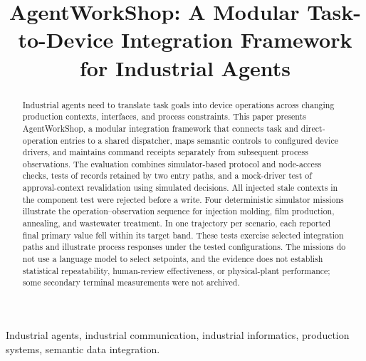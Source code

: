 \documentclass[journal]{IEEEtran}
\begin{document}

\title{AgentWorkShop: A Modular Task-to-Device Integration Framework for Industrial Agents}

\author{}

\maketitle

\begin{abstract}
Industrial agents need to translate task goals into device operations across
changing production contexts, interfaces, and process constraints. This paper
presents AgentWorkShop, a modular integration framework that connects task and
direct-operation entries to a shared dispatcher, maps semantic controls to
configured device drivers, and maintains command receipts separately from
subsequent process observations. The evaluation combines simulator-based
protocol and node-access checks, tests of records retained by two entry paths,
and a mock-driver test of approval-context revalidation using simulated
decisions. All injected stale contexts in the component test were rejected
before a write. Four deterministic
simulator missions illustrate the operation--observation sequence for injection
molding, film production, annealing, and wastewater treatment. In one trajectory
per scenario, each reported final primary value fell within its target band.
These tests exercise selected integration paths and illustrate process
responses under the tested configurations. The missions do not use a language
model to select setpoints, and the evidence does not establish statistical
repeatability, human-review effectiveness, or physical-plant performance;
some secondary terminal measurements were not archived.
\end{abstract}

\begin{IEEEkeywords}
Industrial agents, industrial communication, industrial informatics,
production systems, semantic data integration.
\end{IEEEkeywords}

\IEEEpeerreviewmaketitle










\end{document}
